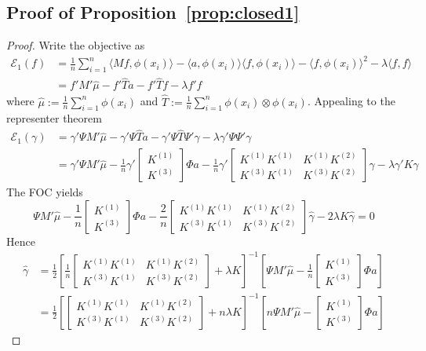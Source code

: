 \subsection{Proof of Proposition~\ref{prop:closed1}}

\begin{proof}
Write the objective as
\begin{align}
    \mathcal{E}_1(f)&= \frac{1}{n}\sum_{i=1}^n \langle Mf,\phi(x_i) \rangle -\langle a,\phi(x_i)\rangle \langle f,\phi(x_i)\rangle -\langle f,\phi(x_i)\rangle^2-\lambda \langle f,f \rangle   \\
    &= f' M' \hat{\mu} -f'\hat{T} a- f' \hat{T} f-\lambda f' f
\end{align}
where $\hat{\mu}:=\frac{1}{n}\sum_{i=1}^n \phi(x_i)$ and $\hat{T}:=\frac{1}{n}\sum_{i=1}^n \phi(x_i)\otimes \phi(x_i)$. Appealing to the representer theorem
\begin{align}
    \mathcal{E}_1(\gamma)&= \gamma'\Psi M' \hat{\mu} -\gamma'\Psi\hat{T} a- \gamma'\Psi \hat{T} \Psi'\gamma-\lambda \gamma'\Psi \Psi'\gamma \\
    &= \gamma'\Psi M' \hat{\mu} -\frac{1}{n}\gamma'\begin{bmatrix}K^{(1)} \\ K^{(3)} \end{bmatrix}\Phi a- \frac{1}{n}\gamma'\begin{bmatrix} K^{(1)}K^{(1)} & K^{(1)} K^{(2)} \\ K^{(3)} K^{(1)} & K^{(3)}K^{(2)}\end{bmatrix}\gamma-\lambda \gamma'K\gamma
\end{align}
The FOC yields
$$
\Psi M' \hat{\mu} -\frac{1}{n}\begin{bmatrix}K^{(1)} \\ K^{(3)} \end{bmatrix}\Phi a- \frac{2}{n}\begin{bmatrix} K^{(1)}K^{(1)} & K^{(1)} K^{(2)} \\ K^{(3)} K^{(1)} & K^{(3)}K^{(2)}\end{bmatrix}\hat{\gamma}-2\lambda K\hat{\gamma}=0
$$
Hence
\begin{align}
    \hat{\gamma}&=\frac{1}{2}\left[\frac{1}{n}\begin{bmatrix} K^{(1)}K^{(1)} & K^{(1)} K^{(2)} \\ K^{(3)} K^{(1)} & K^{(3)}K^{(2)}\end{bmatrix}+\lambda K\right]^{-1}\left[\Psi M' \hat{\mu} -\frac{1}{n}\begin{bmatrix}K^{(1)} \\ K^{(3)} \end{bmatrix}\Phi a\right] \\
    &=
\frac{1}{2}\left[\begin{bmatrix} K^{(1)}K^{(1)} & K^{(1)} K^{(2)} \\ K^{(3)} K^{(1)} & K^{(3)}K^{(2)}\end{bmatrix}+n\lambda K\right]^{-1}\left[n\Psi M' \hat{\mu} -\begin{bmatrix}K^{(1)} \\ K^{(3)} \end{bmatrix}\Phi a\right]
\end{align}


\end{proof}

